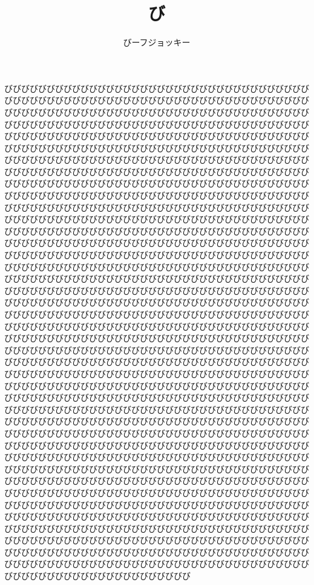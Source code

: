 \documentclass[a4paper, 9pt]{article}
\title{び}
\author{びーフジョッキー}
\begin{document}
\maketitle


びびびびびびびびびびびびびびびびびびびびびびびびびびびびびびびびびびびびびびびびびびびびびびびびびびびびびびびびびびびびびびびびびびびびびびびびびびびびびびびびびびびびびびびびびびびびびびびびびびびびびびびびびびびびびびびびびびびびびびびびびびびびびびびびびびびびびびびびびびびびびびびびびびびびびびびびびびびびびびびびびびびびびびびびびびびびびびびびびびびびびびびびびびびびびびびびびびびびびびびびびびびびびびびびびびびびびびびびびびびびびびびびびびびびびびびびびびびびびびびびびびびびびびびびびびびびびびびびびびびびびびびびびびびびびびびびびびびびびびびびびびびびびびびびびびびびびびびびびびびびびびびびびびびびびびびびびびびびびびびびびびびびびびびびびびびびびびびびびびびびびびびびびびびびびびびびびびびびびびびびびびびびびびびびびびびびびびびびびびびびびびびびびびびびびびびびびびびびびびびびびびびびびびびびびびびびびびびびびびびびびびびびびびびびびびびびびびびびびびびびびびびびびびびびびびびびびびびびびびびびびびびびびびびびびびびびびびびびびびびびびびびびびびびびびびびびびびびびびびびびびびびびびびびびびびびびびびびびびびびびびびびびびびびびびびびびびびびびびびびびびびびびびびびびびびびびびびびびびびびびびびびびびびびびびびびびびびびびびびびびびびびびびびびびびびびびびびびびびびびびびびびびびびびびびびびびびびびびびびびびびびびびびびびびびびびびびびびびびびびびびびびびびびびびびびびびびびびびびびびびびびびびびびびびびびびびびびびびびびびびびびびびびびびびびびびびびびびびびびびびびびびびびびびびびびびびびびびびびびびびびびびびびびびびびびびびびびびびびびびびびびびびびびびびびびびびびびびびびびびびびびびびびびびびびびびびびびびびびびびびびびびびびびびびびびびびびびびびびびびびびびびびびびびびびびびびびびびびびびびびびびびびびびびびびびびびびびびびびびびびびびびびびびびびびびびびびびびびびびびびびびびびびびびびびびびびびびびびびびびびびびびびびびびびびびびびびびびびびびびびびびびびびびびびびびびびびびびびびびびびびびびびびびびびびびびびびびびびびびびびびびびびびびびびびびびびびびびびびびびびびびびびびびびびびびびびびびびびびびびびびびびびびびびびびびびびびびびびびびびびびびびびびびびびびびびびびびびびびびびびびびびびびびびびびびびびびびびびびびびびびびびびびびびびびびびびびびびびびびびびびびびびびびびびびびびびびびびびびびびびびびびびびびびびびびびびびびびびびびびびびびびびびびびびびびびびびびびびびびびびびびびびびびびびびびびびびびびびびびびびびびびびびびびびびびびびびびびびびびびびびびびびびびびびびびびびびびびびびびびびびびびびびびびびびびびびびびびびびびびびびびびびびびびびびびびびびびびびびびびびびびびびびびびびびびびびびびびびびびびびびびびびびびびびびびびびびびびびびびびびびびびびびびびびびびびびびびびびびびびびびびびびびびびびびびびびびびびびびびびびびびびびびびびびびびびびびびびびびびびびびびびびびびびびびびびびびびびびびびびびびびびびびびびびびびびびびびびびびびびびびびびびびびびびびびびびびびびびびびびびびびびびびびびびびびびびびびびびびびびびびびびびびびびびびびびびびびびびびびびびびびびびびびびびびびびびびびびびびびびびびびびびびびびびびびびびびびびびびびびびびびびびびびびびびびびびびびびびびびびびびびびびびびびびびびびびびびびびびび
\end{document}
